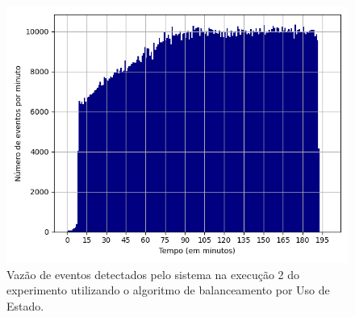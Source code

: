 




\begin{figure}[h]
\centering
\includegraphics[width=\textwidth]{figuras/graphics/histogram_vazao_7-dez-su.png}
\caption{Vazão de eventos detectados pelo sistema na execução 2 do experimento utilizando o algoritmo de balanceamento por Uso de Estado.}
\label{fig:vazao_7-dez-su}
\end{figure}




